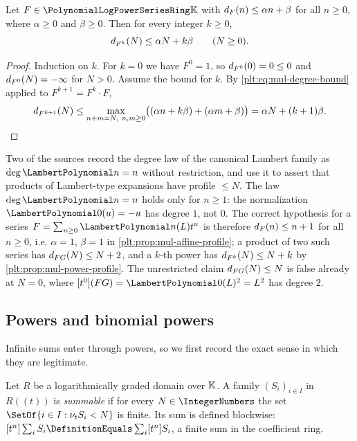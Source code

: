 \begin{proposition}
\label{plt:prop:mul-power-profile}
Let $F\in\PLpow$ with $d_{F}(n)\le\alpha n+\beta$ for all $n\ge0$,
where $\alpha\ge0$ and $\beta\ge0$.  Then for every integer $k\ge0$,
\begin{equation}\label{plt:eq:mul-power-profile}
 d_{F^k}(N)\le\alpha N+k\beta
 \qquad(N\ge0).
\end{equation}
\end{proposition}

\begin{proof}
Induction on $k$.  For $k=0$ we have $F^0=1$, so $d_{F^0}(0)=0\le0$
and $d_{F^0}(N)=-\infty$ for $N>0$.  Assume the bound for $k$.  By
\eqref{plt:eq:mul-degree-bound} applied to $F^{k+1}=F^k\cdot F$,
\[
 d_{F^{k+1}}(N)
 \le\max_{n+m=N,\ n,m\ge0}\bigl((\alpha n+k\beta)+(\alpha m+\beta)\bigr)
 =\alpha N+(k+1)\beta .
\]
\end{proof}

\begin{remark}
\label{plt:rmk:mul-lambert-profile}
Two of the sources record the degree law of the canonical Lambert family as
$\deg\LamP{n}=n$ without restriction, and use it to assert that products of
Lambert-type expansions have profile $\le N$.  The law
$\deg\LamP{n}=n$ holds only for $n\ge1$: the normalization
$\LamP{0}(u)=-u$ has degree $1$, not $0$.  The correct hypothesis for a
series $F=\sum_{n\ge0}\LamP{n}(L)t^n$ is therefore
$d_{F}(n)\le n+1$ for all $n\ge0$, i.e. $\alpha=1$, $\beta=1$ in
\cref{plt:prop:mul-affine-profile}; a product of two such series has
$d_{FG}(N)\le N+2$, and a $k$-th power has
$d_{F^k}(N)\le N+k$ by \cref{plt:prop:mul-power-profile}.  The
unrestricted claim $d_{FG}(N)\le N$ is false already at $N=0$, where
$[t^0](FG)=\LamP{0}(L)^2=L^2$ has degree $2$.
\end{remark}

\subsection{Powers and binomial powers}
\label{plt:sec:mul-powers}

Infinite sums enter through powers, so we first record the exact sense in
which they are legitimate.

\begin{definition}
\label{plt:def:mul-summable}
Let $R$ be a logarithmically graded domain over $\mathbb{K}$.  A family
$(S_i)_{i\in I}$ in $R((t))$ is \emph{summable} if for every
$N\in\IntegerNumbers$ the set $\SetOf{i\in I:\ordt S_i<N}$ is finite.  Its
sum is defined blockwise:
$[t^n]\sum_{i}S_i\DefinitionEquals\sum_i[t^n]S_i$, a finite sum in the
coefficient ring.
\end{definition}

